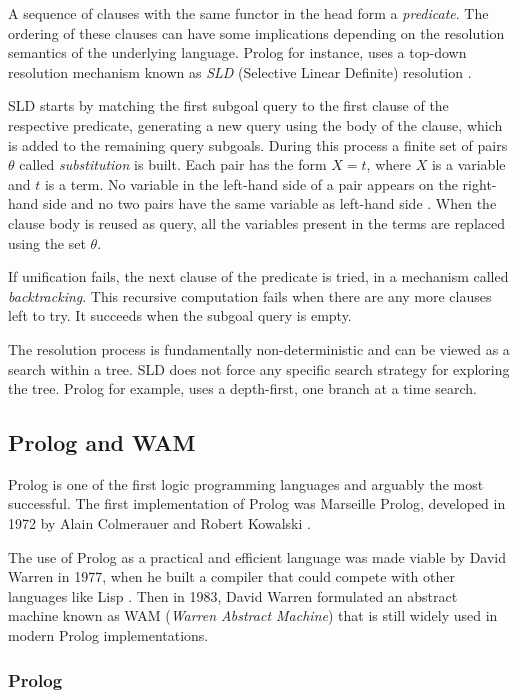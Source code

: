 A sequence of clauses with the same functor in the head form a \textit{predicate}. The ordering
of these clauses can have some implications depending on the resolution semantics of the underlying language.
Prolog for instance, uses a top-down resolution mechanism known as \textit{SLD} (Selective Linear Definite) resolution \cite{Lloyd-87}.

SLD starts by matching the first subgoal query to the first clause of the respective predicate,
generating a new query using the body of the clause, which is added to the remaining query subgoals.
During this process a finite set of pairs $\theta$ called \textit{substitution} is built.
Each pair has the form $X = t$, where $X$ is a variable and $t$ is a term. No variable in the left-hand side
of a pair appears on the right-hand side and no two pairs have the same variable as left-hand side \cite{Sterling-94}. 
When the clause body is reused as query, all the variables present in the terms are replaced using the
set $\theta$. 

If unification fails, the next clause of the predicate is tried, in a mechanism called \textit{backtracking}.
This recursive computation fails when there are any more clauses left to try. It succeeds when the subgoal query is empty.

The resolution process is fundamentally non-deterministic and can be viewed as a search within a tree. SLD
does not force any specific search strategy for exploring the tree. Prolog for example, uses a depth-first, one
branch at a time search.

\subsection{Prolog and WAM}
  
Prolog is one of the first logic programming languages and arguably the most successful.
The first implementation of Prolog was Marseille Prolog, developed in 1972 by Alain Colmerauer and Robert Kowalski \cite{Kowalski-74}.

The use of Prolog as a practical and efficient language was made viable by David Warren in 1977, when he built a compiler that could
compete with other languages like Lisp \cite{Warren-77}. Then in 1983, David Warren formulated an abstract machine known as WAM
(\textit{Warren Abstract Machine}) \cite{Warren-83} that is still widely used in modern Prolog implementations.

\subsubsection{Prolog}

